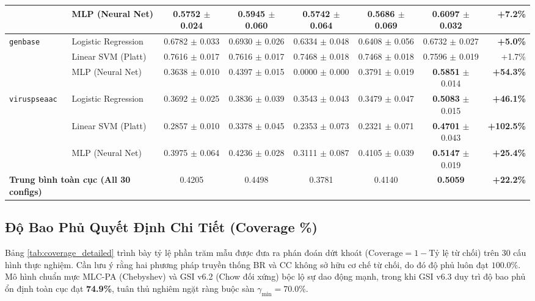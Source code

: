 \documentclass[10pt,a4paper,twoside]{article}
\begin{document}
\begin{table}[H]
{\begin{tabular}{llcccccr}
 & MLP (Neural Net) & 0.5752 $\pm$ 0.024 & 0.5945 $\pm$ 0.060 & 0.5742 $\pm$ 0.064 & 0.5686 $\pm$ 0.069 & \textbf{0.6097} $\pm$ 0.032 & \textbf{+7.2\%} \\
\midrule
\multirow{3}{*}{\texttt{genbase}} & Logistic Regression & 0.6782 $\pm$ 0.033 & 0.6930 $\pm$ 0.026 & 0.6334 $\pm$ 0.048 & 0.6408 $\pm$ 0.056 & 0.6732 $\pm$ 0.027 & \textbf{+5.0\%} \\
 & Linear SVM (Platt) & 0.7616 $\pm$ 0.017 & 0.7616 $\pm$ 0.017 & 0.7468 $\pm$ 0.018 & 0.7468 $\pm$ 0.018 & 0.7596 $\pm$ 0.019 & +1.7\% \\
 & MLP (Neural Net) & 0.3638 $\pm$ 0.010 & 0.4397 $\pm$ 0.015 & 0.0000 $\pm$ 0.000 & 0.3791 $\pm$ 0.019 & \textbf{0.5851} $\pm$ 0.014 & \textbf{+54.3\%} \\
\midrule
\multirow{3}{*}{\texttt{viruspseaac}} & Logistic Regression & 0.3692 $\pm$ 0.025 & 0.3836 $\pm$ 0.039 & 0.3543 $\pm$ 0.043 & 0.3479 $\pm$ 0.047 & \textbf{0.5083} $\pm$ 0.015 & \textbf{+46.1\%} \\
 & Linear SVM (Platt) & 0.2857 $\pm$ 0.010 & 0.3378 $\pm$ 0.045 & 0.2353 $\pm$ 0.073 & 0.2321 $\pm$ 0.071 & \textbf{0.4701} $\pm$ 0.043 & \textbf{+102.5\%} \\
 & MLP (Neural Net) & 0.3975 $\pm$ 0.064 & 0.4236 $\pm$ 0.028 & 0.3111 $\pm$ 0.087 & 0.4105 $\pm$ 0.039 & \textbf{0.5147} $\pm$ 0.019 & \textbf{+25.4\%} \\
\midrule
\multicolumn{2}{l}{\textbf{Trung bình toàn cục (All 30 configs)}} & 0.4205 & 0.4498 & 0.3781 & 0.4140 & \textbf{0.5059} & \textbf{+22.2\%} \\
\bottomrule
\end{tabular}%
}
\end{table}

\clearpage
\subsection{Độ Bao Phủ Quyết Định Chi Tiết (Coverage \%)}
Bảng \ref{tab:coverage_detailed} trình bày tỷ lệ phần trăm mẫu được đưa ra phán đoán dứt khoát ($\text{Coverage} = 1 - \text{Tỷ lệ từ chối}$) trên 30 cấu hình thực nghiệm. Cần lưu ý rằng hai phương pháp truyền thống BR và CC không sở hữu cơ chế từ chối, do đó độ phủ luôn đạt $100.0\%$. Mô hình chuẩn mực MLC-PA (Chebyshev) và GSI v6.2 (Chow đối xứng) bộc lộ sự dao động mạnh, trong khi GSI v6.3 duy trì độ bao phủ ổn định toàn cục đạt \textbf{74.9\%}, tuân thủ nghiêm ngặt ràng buộc sàn $\gamma_{\min} = 70.0\%$.
\end{document}
